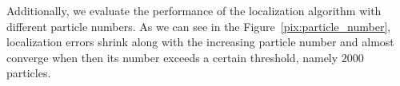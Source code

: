 Additionally, we evaluate the performance of the localization algorithm with different particle numbers.
As we can see in the Figure~\ref{pix:particle_number}, localization errors shrink along with the increasing particle number and almost converge when then its number exceeds a certain threshold, namely $2000$ particles.





